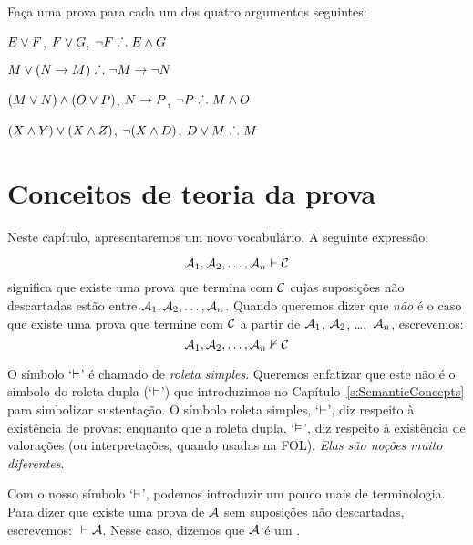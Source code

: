 \problempart 
Faça uma prova para cada um dos quatro argumentos seguintes:
\begin{earg}
\item $E\vee F$, $F\vee G$, $\neg F \mathrel{\ldotp\dot{}\,\ldotp} E \wedge G$
\item $M\vee(N\rightarrow M) \mathrel{\ldotp\dot{}\,\ldotp} \neg M \rightarrow \neg N$
\item $(M \vee N) \wedge (O \vee P)$, $N \rightarrow P$, $\neg P \mathrel{\ldotp\dot{}\,\ldotp} M\wedge O$
\item $(X\wedge Y)\vee(X\wedge Z)$, $\neg(X\wedge D)$, $D\vee M \mathrel{\ldotp\dot{}\,\ldotp} M$
\end{earg}


\chapter{Conceitos de teoria da prova}\label{s:ProofTheoreticConcepts}

 Neste capítulo, apresentaremos um novo vocabulário. A seguinte expressão:
 
$$\mathcal{A}_1, \mathcal{A}_2, \ldots, \mathcal{A}_n \vdash \mathcal{C}$$
significa que existe uma prova que termina com $\mathcal{C}$  cujas suposições não descartadas estão entre $\mathcal{A}_1, \mathcal{A}_2, \ldots, \mathcal{A}_n$. Quando queremos dizer que  \emph{não} é o caso que existe uma prova que termine com $\mathcal{C}$ a partir de $\mathcal{A}_1$, $\mathcal{A}_2$, \dots,~$\mathcal{A}_n$, escrevemos:  $$\mathcal{A}_1, \mathcal{A}_2, \ldots, \mathcal{A}_n \nvdash \mathcal{C}$$  

O símbolo `$\vdash$'  é chamado de  \emph{roleta simples}. Queremos enfatizar que este não é o símbolo do roleta dupla (`$\vDash$') que introduzimos no Capítulo~\ref{s:SemanticConcepts}  para simbolizar sustentação. O símbolo roleta simples, `$\vdash$', diz respeito à existência de provas; enquanto que a roleta dupla, `$\vDash$', diz respeito à existência de valorações (ou interpretações, quando usadas na FOL). \emph{Elas são noções muito diferentes}.

Com o nosso símbolo  `$\vdash$',  podemos introduzir um pouco mais de terminologia. Para dizer que existe uma prova de $\mathcal{A}$ sem suposições não descartadas, escrevemos: ${} \vdash \mathcal{A}$. Nesse caso, dizemos que $\mathcal{A}$ é um .

